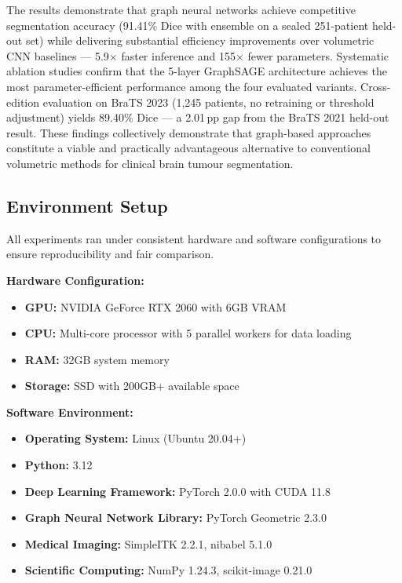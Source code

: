 \documentclass{article}
\begin{document}
The results demonstrate that graph neural networks achieve competitive segmentation accuracy (91.41\% Dice with ensemble on a sealed 251-patient held-out set) while delivering substantial efficiency improvements over volumetric CNN baselines — 5.9$\times$ faster inference and 155$\times$ fewer parameters. Systematic ablation studies confirm that the 5-layer GraphSAGE architecture achieves the most parameter-efficient performance among the four evaluated variants. Cross-edition evaluation on BraTS 2023 (1,245 patients, no retraining or threshold adjustment) yields 89.40\% Dice — a 2.01\,pp gap from the BraTS 2021 held-out result. These findings collectively demonstrate that graph-based approaches constitute a viable and practically advantageous alternative to conventional volumetric methods for clinical brain tumour segmentation.


\subsection{Environment Setup}

All experiments ran under consistent hardware and software configurations to ensure reproducibility and fair comparison.

\textbf{Hardware Configuration:}
\begin{itemize}
    \item \textbf{GPU:} NVIDIA GeForce RTX 2060 with 6GB VRAM
    \item \textbf{CPU:} Multi-core processor with 5 parallel workers for data loading
    \item \textbf{RAM:} 32GB system memory
    \item \textbf{Storage:} SSD with 200GB+ available space
\end{itemize}

\textbf{Software Environment:}
\begin{itemize}
    \item \textbf{Operating System:} Linux (Ubuntu 20.04+)
    \item \textbf{Python:} 3.12
    \item \textbf{Deep Learning Framework:} PyTorch 2.0.0 with CUDA 11.8
    \item \textbf{Graph Neural Network Library:} PyTorch Geometric 2.3.0
    \item \textbf{Medical Imaging:} SimpleITK 2.2.1, nibabel 5.1.0
    \item \textbf{Scientific Computing:} NumPy 1.24.3, scikit-image 0.21.0
\end{itemize}
\end{document}
